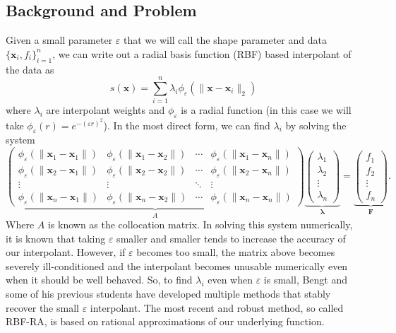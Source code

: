\documentclass[a4paper,11pt]{article}
\newcommand{\eps}{\varepsilon}
\newcommand{\norm}[1]{\lVert #1 \rVert}
\newcommand{\pmat}[1]{\begin{pmatrix} #1 \end{pmatrix}}
\begin{document}
\subsection*{Background and Problem}
Given a small parameter $ \eps $ that we will call the shape parameter and data $ \{\mathbf{x}_i, f_i\}_{i = 1}^n $, we can write out a radial basis function (RBF) based interpolant of the data as
\begin{equation}
	s(\mathbf{x}) = \sum_{i = 1}^n \lambda_i \phi_\eps(\norm{\mathbf{x} - \mathbf{x}_i}_2)
\end{equation}
where $ \lambda_i $ are interpolant weights and $ \phi_\eps $ is a radial function (in this case we will take $ \phi_\eps(r) = e^{-(\eps r)^2} $). In the most direct form, we can find $ \lambda_i $ by solving the system
\begin{equation}
	\underbrace{\pmat{
		\phi_\eps (\norm{\mathbf{x}_1 - \mathbf{x}_1}) & \phi_\eps (\norm{\mathbf{x}_1 - \mathbf{x}_2}) & \cdots & \phi_\eps (\norm{\mathbf{x}_1 - \mathbf{x}_n}) \\
		\phi_\eps (\norm{\mathbf{x}_2 - \mathbf{x}_1}) & \phi_\eps (\norm{\mathbf{x}_2 - \mathbf{x}_2}) & \cdots & \phi_\eps (\norm{\mathbf{x}_2 - \mathbf{x}_n}) \\
		\vdots & \vdots & \ddots & \vdots \\
		\phi_\eps (\norm{\mathbf{x}_n - \mathbf{x}_1}) & \phi_\eps (\norm{\mathbf{x}_n - \mathbf{x}_2}) & \cdots & \phi_\eps (\norm{\mathbf{x}_n - \mathbf{x}_n})
	}}_{A} \underbrace{\pmat{
		\lambda_1 \\ \lambda_2 \\ \vdots \\ \lambda_n
	}}_{\pmb{\lambda}} = \underbrace{\pmat{
		f_1 \\ f_2 \\ \vdots \\ f_n
	}}_{\pmb{F}}.
\end{equation}
Where $ A $ is known as the collocation matrix. In solving this system numerically, it is known that taking $ \eps $ smaller and smaller tends to increase the accuracy of our interpolant. However, if $ \eps $ becomes too small, the matrix above becomes severely ill-conditioned and the interpolant becomes unusable numerically even when it should be well behaved. So, to find $ \lambda_i $ even when $ \eps $ is small, Bengt and some of his previous students have developed multiple methods that stably recover the small $ \eps $ interpolant. The most recent and robust method, so called RBF-RA, is based on rational approximations of our underlying function. 
\end{document}

